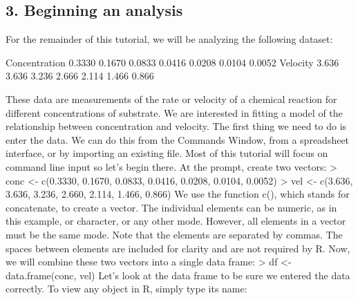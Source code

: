 \subsection*{3. Beginning an analysis}


For the remainder of this tutorial, we will be analyzing the following dataset: 

Concentration
0.3330
0.1670
0.0833
0.0416
0.0208
0.0104
0.0052
Velocity
3.636
3.636
3.236
2.666
2.114
1.466
0.866

These data are measurements of the rate or velocity of a chemical reaction for different concentrations of substrate. We are interested in fitting a model of the relationship between concentration and velocity. The first thing we need to do is enter the data. We can do this from the Commands Window, from a spreadsheet interface, or by importing an existing file. Most of this tutorial will focus on command line input so let's begin there. At the prompt, create two vectors: 
> conc <- c(0.3330, 0.1670, 0.0833, 0.0416, 0.0208, 0.0104, 0.0052)
> vel <- c(3.636, 3.636, 3.236, 2.660, 2.114, 1.466, 0.866)
We use the function c(), which stands for concatenate, to create a vector. The individual elements can be numeric, as in this example, or character, or any other mode. However, all elements in a vector must be the same mode. Note that the elements are separated by commas. The spaces between elements are included for clarity and are not required by R. 
Now, we will combine these two vectors into a single data frame: 
> df <- data.frame(conc, vel)
Let's look at the data frame to be sure we entered the data correctly. To view any object in R, simply type its name: 

